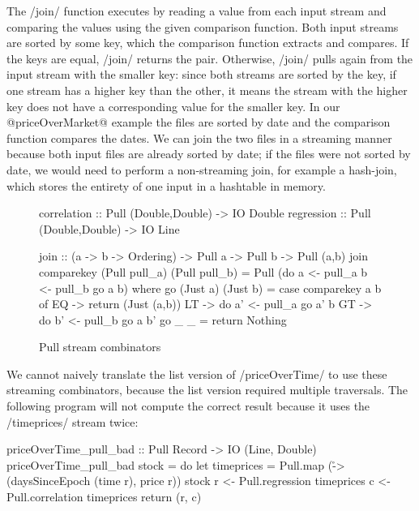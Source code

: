 The \Hs/join/ function executes by reading a value from each input stream and comparing the values using the given comparison function.
Both input streams are sorted by some key, which the comparison function extracts and compares.
If the keys are equal, \Hs/join/ returns the pair.
Otherwise, \Hs/join/ pulls again from the input stream with the smaller key: since both streams are sorted by the key, if one stream has a higher key than the other, it means the stream with the higher key does not have a corresponding value for the smaller key.
In our @priceOverMarket@ example the files are sorted by date and the comparison function compares the dates.
We can join the two files in a streaming manner because both input files are already sorted by date; if the files were not sorted by date, we would need to perform a non-streaming join, for example a hash-join, which stores the entirety of one input in a hashtable in memory.


\begin{figure}
\begin{haskell}
correlation :: Pull (Double,Double) -> IO Double
regression  :: Pull (Double,Double) -> IO Line

join        :: (a -> b -> Ordering) -> Pull a -> Pull b -> Pull (a,b)
join comparekey (Pull pull_a) (Pull pull_b) = Pull (do
   a <- pull_a
   b <- pull_b
   go a b)
 where
  go (Just a) (Just b)
   = case comparekey a b of
      EQ -> return (Just (a,b))
      LT -> do
        a' <- pull_a
        go a' b
      GT -> do
        b' <- pull_b
        go a b'
  go _ _ = return Nothing
\end{haskell}
\caption{Pull stream combinators}
\label{figs/impl/pull/combinator}
\end{figure}

We cannot naively translate the list version of \Hs/priceOverTime/ to use these streaming combinators, because the list version required multiple traversals.
The following program will not compute the correct result because it uses the \Hs/timeprices/ stream twice:

\begin{haskell}
priceOverTime_pull_bad :: Pull Record -> IO (Line, Double)
priceOverTime_pull_bad stock = do
  let timeprices = Pull.map (\r -> (daysSinceEpoch (time r), price r)) stock
  r <- Pull.regression  timeprices
  c <- Pull.correlation timeprices
  return (r, c)
\end{haskell}

